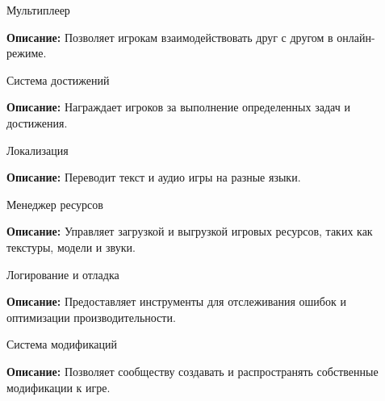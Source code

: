 \begin{DoxyEnumerate}
\item Мультиплеер
\end{DoxyEnumerate}
\begin{DoxyItemize}
\item {\bfseries{Описание\+:}} Позволяет игрокам взаимодействовать друг с другом в онлайн-\/режиме.
\end{DoxyItemize}
\begin{DoxyEnumerate}
\item Система достижений
\end{DoxyEnumerate}
\begin{DoxyItemize}
\item {\bfseries{Описание\+:}} Награждает игроков за выполнение определенных задач и достижения.
\end{DoxyItemize}
\begin{DoxyEnumerate}
\item Локализация
\end{DoxyEnumerate}
\begin{DoxyItemize}
\item {\bfseries{Описание\+:}} Переводит текст и аудио игры на разные языки.
\end{DoxyItemize}
\begin{DoxyEnumerate}
\item Менеджер ресурсов
\end{DoxyEnumerate}
\begin{DoxyItemize}
\item {\bfseries{Описание\+:}} Управляет загрузкой и выгрузкой игровых ресурсов, таких как текстуры, модели и звуки.
\end{DoxyItemize}
\begin{DoxyEnumerate}
\item Логирование и отладка
\end{DoxyEnumerate}
\begin{DoxyItemize}
\item {\bfseries{Описание\+:}} Предоставляет инструменты для отслеживания ошибок и оптимизации производительности.
\end{DoxyItemize}
\begin{DoxyEnumerate}
\item Система модификаций
\end{DoxyEnumerate}
\begin{DoxyItemize}
\item {\bfseries{Описание\+:}} Позволяет сообществу создавать и распространять собственные модификации к игре.
\end{DoxyItemize}

